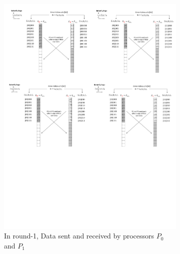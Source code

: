\documentclass[submission]{iacrtrans}
\theoremstyle{plain}
\begin{document}
\begin{figure}[!tb]
\begin{subfigure}[b]{0.47\textwidth}
\includegraphics[width=\textwidth]{./fig/DataSwapWithoutPerm3.pdf}
\caption{In round-1, Data sent and received by processors $P_0$ and $P_1$}\label{fig:dataswap_without_perm3}
\end{subfigure}
\hspace{1em}
\begin{subfigure}[b]{.47\textwidth}\centering

\end{subfigure}
\end{figure}
\end{document}
